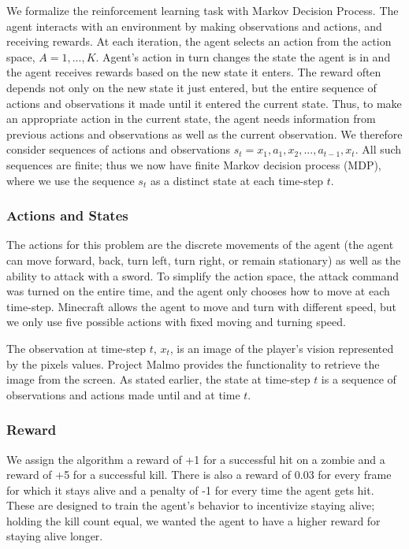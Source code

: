 \documentclass{article}
\begin{document}
\begin{multicols}{2}
We formalize the reinforcement learning task with Markov Decision Process.
The agent interacts with an environment by making observations and actions, and receiving rewards.
At each iteration, the agent selects an action from the action space, $A = {1, . . . , K }$.
Agent's action in turn changes the state the agent is in and the agent receives rewards based on the new state it enters.
The reward often depends not only on the new state it just entered, but the entire sequence of actions and observations it made until it entered the current state.
Thus, to make an appropriate action in the current state, the agent needs information from previous actions and observations as well as the current observation. We therefore consider sequences of actions and observations $s_t = x_1, a_1, x_2, ..., a_{t-1}, x_t$. All such sequences are finite; thus we now have finite Markov decision process (MDP), where we use the sequence $s_t$ as a distinct state at each time-step $t$.

\subsubsection{Actions and States}

The actions for this problem are the discrete movements of the agent (the agent can move forward, back, turn left, turn right, or remain stationary) as well as the ability to attack with a sword. To simplify the action space, the attack command was turned on the entire time, and the agent only chooses how to move at each time-step. Minecraft allows the agent to move and turn with different speed, but we only use five possible actions with fixed moving and turning speed.

The observation at time-step $t$, $x_t$, is an image of the player's vision represented by the pixels values.
Project Malmo provides the functionality to retrieve the image from the screen.
As stated earlier, the state at time-step $t$ is a sequence of observations and actions made until and at time $t$.


\subsubsection{Reward}

We assign the algorithm a reward of +1 for a successful hit on a zombie and a reward of +5 for a successful kill.
There is also a reward of 0.03 for every frame for which it stays alive and a penalty of -1 for every time the agent gets hit. These are designed to train the agent's behavior to incentivize staying alive; holding the kill count equal, we wanted the agent to have a higher reward for staying alive longer.



\end{multicols}
\end{document}
